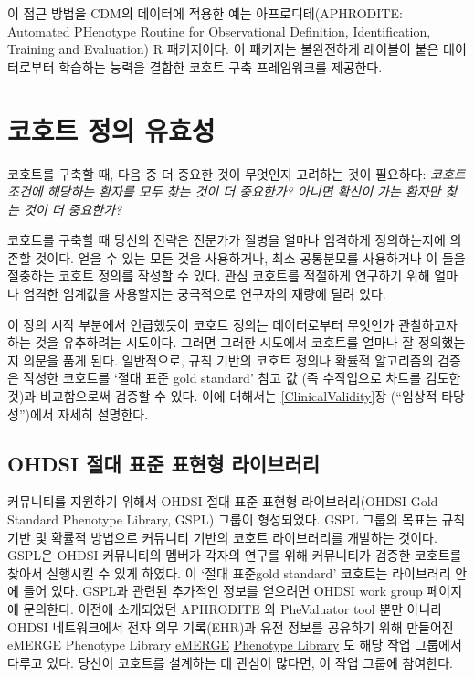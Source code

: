 \documentclass[10.5pt]{book}
\theoremstyle{definition}
\theoremstyle{definition}
\theoremstyle{definition}
\theoremstyle{remark}
\begin{document}
이 접근 방법을 CDM의 데이터에 적용한 예는 아프로디테(APHRODITE:
Automated PHenotype Routine for Observational Definition,
Identification, Training and Evaluation) R 패키지이다. 이 패키지는
불완전하게 레이블이 붙은 데이터로부터 학습하는 능력을 결합한 코호트 구축
프레임워크를 제공한다. \citep{Banda2017APHRODITE} 

\section{코호트 정의 유효성}\label{--}

코호트를 구축할 때, 다음 중 더 중요한 것이 무엇인지 고려하는 것이
필요하다: \emph{코호트 조건에 해당하는 환자를 모두 찾는 것이 더
중요한가? 아니면 확신이 가는 환자만 찾는 것이 더 중요한가?}

코호트를 구축할 때 당신의 전략은 전문가가 질병을 얼마나 엄격하게
정의하는지에 의존할 것이다. 얻을 수 있는 모든 것을 사용하거나, 최소
공통분모를 사용하거나 이 둘을 절충하는 코호트 정의를 작성할 수 있다.
관심 코호트를 적절하게 연구하기 위해 얼마나 엄격한 임계값을 사용할지는
궁극적으로 연구자의 재량에 달려 있다.

이 장의 시작 부분에서 언급했듯이 코호트 정의는 데이터로부터 무엇인가
관찰하고자 하는 것을 유추하려는 시도이다. 그러면 그러한 시도에서
코호트를 얼마나 잘 정의했는지 의문을 품게 된다. 일반적으로, 규칙 기반의
코호트 정의나 확률적 알고리즘의 검증은 작성한 코호트를 `절대 표준 gold
standard' 참고 값 (즉 수작업으로 차트를 검토한 것)과 비교함으로써 검증할
수 있다. 이에 대해서는 \ref{ClinicalValidity}장 (``임상적 타당성'')에서
자세히 설명한다.

\subsection{OHDSI 절대 표준 표현형 라이브러리}\label{ohdsi----}

커뮤니티를 지원하기 위해서 OHDSI 절대 표준 표현형 라이브러리(OHDSI Gold
Standard Phenotype Library, GSPL) 그룹이 형성되었다. GSPL 그룹의 목표는
규칙 기반 및 확률적 방법으로 커뮤니티 기반의 코호트 라이브러리를
개발하는 것이다. GSPL은 OHDSI 커뮤니티의 멤버가 각자의 연구를 위해
커뮤니티가 검증한 코호트를 찾아서 실행시킬 수 있게 하였다. 이 `절대
표준gold standard' 코호트는 라이브러리 안에 들어 있다. GSPL과 관련된
추가적인 정보를 얻으려면 OHDSI work group 페이지에 문의한다. 이전에
소개되었던 APHRODITE \citep{Banda2017APHRODITE} 와 PheValuator tool
\citep{Swerdel2019phevaluator} 뿐만 아니라 OHDSI 네트워크에서 전자 의무
기록(EHR)과 유전 정보를 공유하기 위해 만들어진 eMERGE Phenotype Library
\href{https://emerge.mc.vanderbilt.edu/}{eMERGE}
\href{https://phekb.org/phenotypes}{Phenotype Library}
\citep{Hripcsak2019eMERGE} 도 해당 작업 그룹에서 다루고 있다. 당신이
코호트를 설계하는 데 관심이 많다면, 이 작업 그룹에 참여한다.
\end{document}
